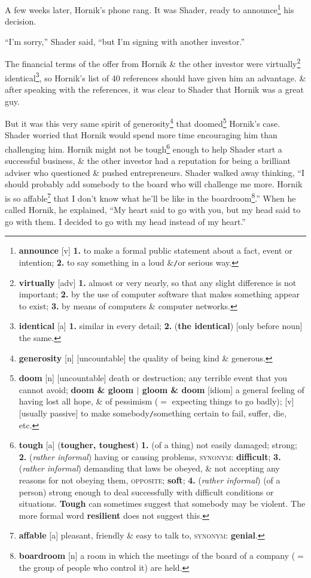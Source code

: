 \documentclass[oneside]{book}
\numberwithin{equation}{section}
\begin{document}
A few weeks later, Hornik's phone rang. It was Shader, ready to announce\footnote{\textbf{announce} [v] \textbf{1.} to make a formal public statement about a fact, event or intention; \textbf{2.} to say something in a loud \&\texttt{/}or serious way.} his decision.

``I'm sorry,'' Shader said, ``but I'm signing with another investor.''

The financial terms of the offer from Hornik \& the other investor were virtually\footnote{\textbf{virtually} [adv] \textbf{1.} almost or very nearly, so that any slight difference is not important; \textbf{2.} by the use of computer software that makes something appear to exist; \textbf{3.} by means of computers \& computer networks.} identical\footnote{\textbf{identical} [a] \textbf{1.} similar in every detail; \textbf{2.} (\textbf{the identical}) [only before noun] the same.}, so Hornik's list of 40 references should have given him an advantage. \& after speaking with the references, it was clear to Shader that Hornik was a great guy.

But it was this very same spirit of generosity\footnote{\textbf{generosity} [n] [uncountable] the quality of being kind \& generous.} that doomed\footnote{\textbf{doom} [n] [uncountable] death or destruction; any terrible event that you cannot avoid; \textbf{doom \& gloom $|$ gloom \& doom} [idiom] a general feeling of having lost all hope, \& of pessimism ($=$ expecting things to go badly); [v] [usually passive] to make somebody\texttt{/}something certain to fail, suffer, die, etc.} Hornik's case. Shader worried that Hornik would spend more time encouraging him than challenging him. Hornik might not be tough\footnote{\textbf{tough} [a] (\textbf{tougher, toughest}) \textbf{1.} (of a thing) not easily damaged; strong; \textbf{2.} (\textit{rather informal}) having or causing problems, \textsc{synonym}: \textbf{difficult}; \textbf{3.} (\textit{rather informal}) demanding that laws be obeyed, \& not accepting any reasons for not obeying them, \textsc{opposite}; \textbf{soft}; \textbf{4.} (\textit{rather informal}) (of a person) strong enough to deal successfully with difficult conditions or situations. \textbf{Tough} can sometimes suggest that somebody may be violent. The more formal word \textbf{resilient} does not suggest this.} enough to help Shader start a successful business, \& the other investor had a reputation for being a brilliant adviser who questioned \& pushed entrepreneurs. Shader walked away thinking, ``I should probably add somebody to the board who will challenge me more. Hornik is so affable\footnote{\textbf{affable} [a] pleasant, friendly \& easy to talk to, \textsc{synonym}: \textbf{genial}.} that I don't know what he'll be like in the boardroom\footnote{\textbf{boardroom} [n] a room in which the meetings of the board of a company ($=$ the group of people who control it) are held.}.'' When he called Hornik, he explained, ``My heart said to go with you, but my head said to go with them. I decided to go with my head instead of my heart.''
\end{document}
